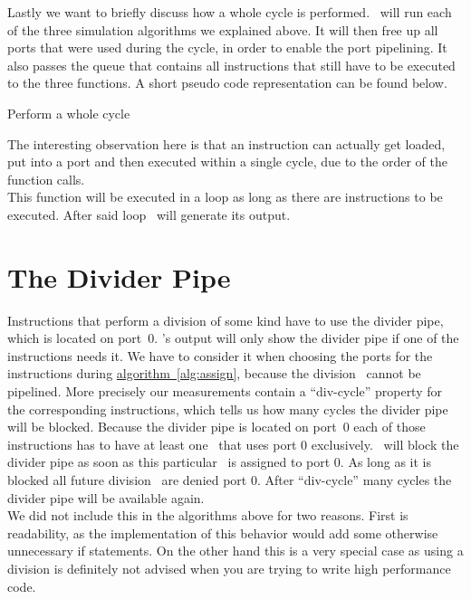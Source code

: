 Lastly we want to briefly discuss how a whole cycle is performed. \suaca\ will run each of the three simulation algorithms we explained above. It will then free up all ports that were used during the cycle, in order to enable the port pipelining. It also passes the queue that contains all instructions that still have to be executed to the three functions. A short pseudo code representation can be found below.
\newpage
\begin{algorithm}[H]
    \SetAlgoLined
    \caption{Perform a whole cycle}
\end{algorithm}
\vspace{5pt}
The interesting observation here is that an instruction can actually get loaded, put into a port and then executed within a single cycle, due to the order of the function calls.\\
This function will be executed in a loop as long as there are instructions to be executed. After said loop \suaca\ will generate its output.


\section{The Divider Pipe}
\label{sec:dividerpipe}

Instructions that perform a division of some kind have to use the divider pipe, which is located on port~$0$. \suaca's output will only show the divider pipe if one of the instructions needs it. We have to consider it when choosing the ports for the instructions during \hyperref[alg:assign]{algorithm~\ref*{alg:assign}}, because the division \microops\ cannot be pipelined. More precisely our measurements contain a ``div-cycle'' property for the corresponding instructions, which tells us how many cycles the divider pipe will be blocked. Because the divider pipe is located on port~$0$ each of those instructions has to have at least one \microop\ that uses port $0$ exclusively. \suaca\ will block the divider pipe as soon as this particular \microop\ is assigned to port $0$. As long as it is blocked all future division \microops\ are denied port $0$. After ``div-cycle'' many cycles the divider pipe will be available again.\\
We did not include this in the algorithms above for two reasons. First is readability, as the implementation of this behavior would add some otherwise unnecessary if statements. On the other hand this is a very special case as using a division is definitely not advised when you are trying to write high performance code.
